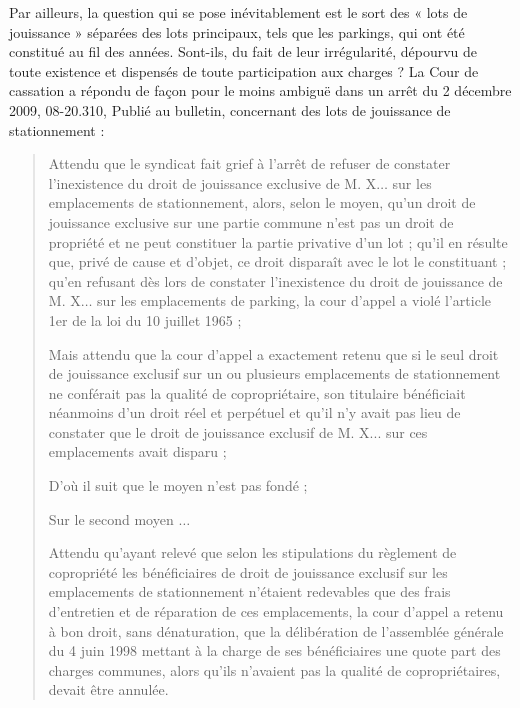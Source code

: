 			Par ailleurs, la question qui se pose inévitablement est le sort des « lots de jouissance » séparées des lots
			principaux, tels que les parkings, qui ont été constitué au fil des années. Sont-ils, du fait de leur irrégularité,
			dépourvu de toute existence et dispensés de toute participation aux charges ? La Cour de cassation a
			répondu de façon pour le moins ambiguë dans un arrêt du 2 décembre 2009, 08-20.310, Publié au bulletin,
			concernant des lots de jouissance de stationnement :
			
			\begin{quote}
				Attendu que le syndicat fait grief à l'arrêt de refuser de constater l'inexistence du droit de jouissance exclusive de M.	X$\dots$ sur les emplacements de stationnement, alors, selon le moyen, qu'un droit de jouissance exclusive sur une partie		commune n'est pas un droit de propriété et ne peut constituer la partie privative d'un lot ; qu'il en résulte que, privé		de cause et d'objet, ce droit disparaît avec le lot le constituant ; qu'en refusant dès lors de constater l'inexistence du	droit de jouissance de M. X$\dots$ sur les emplacements de parking, la cour d'appel a violé l'article 1er de la loi du 10 juillet	1965 ;
				
				Mais attendu que la cour d'appel a exactement retenu que si le seul droit de jouissance exclusif sur un ou plusieurs
				emplacements de stationnement ne conférait pas la qualité de copropriétaire, son titulaire bénéficiait néanmoins
				d'un droit réel et perpétuel et qu'il n'y avait pas lieu de constater que le droit de jouissance exclusif de M. X... sur	ces emplacements avait disparu ;
				
				D'où il suit que le moyen n'est pas fondé ;
			
				Sur le second moyen $\dots$
				
				Attendu qu'ayant relevé que selon les stipulations du règlement de copropriété les bénéficiaires de droit de
				jouissance exclusif sur les emplacements de stationnement n'étaient redevables que des frais d'entretien et de
				réparation de ces emplacements, la cour d'appel a retenu à bon droit, sans dénaturation, que la délibération  de
				l'assemblée générale du 4 juin 1998 mettant à la charge de ses bénéficiaires une quote part des charges communes,
				alors qu'ils n'avaient pas la qualité de copropriétaires, devait être annulée.
			\end{quote}
			
